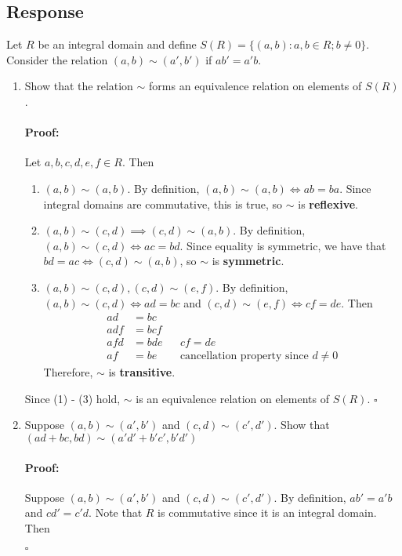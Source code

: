 \documentclass [12pt] {article}
\newenvironment{proof}{\paragraph{Proof:}}{\hfill$\square$}
\begin{document}
\subsection*{Response}
Let $R$ be an integral domain and define $S(R) = \{ (a, b) : a, b \in R; b \neq 0 \}$. Consider
the relation $(a, b) \sim (a', b')$ if $ab' = a'b$.
\begin{enumerate}
    \item Show that the relation $\sim$ forms an equivalence relation on elements of $S(R)$.
        \begin{proof}
            Let $a, b, c, d, e, f \in R$. Then
            \begin{enumerate}[label=\textit{(\roman*)}]
                \item $(a, b) \sim (a, b)$. By definition, $(a, b) \sim (a, b) \iff ab = ba$. Since
                    integral domains are commutative, this is true, so $\sim$ is \textbf{reflexive}.
                \item $(a, b) \sim (c, d) \implies (c, d) \sim (a, b)$. By definition,
                    $(a, b) \sim (c, d) \iff ac = bd$. Since equality is symmetric, we have that
                    $bd = ac \iff (c, d) \sim (a, b)$, so $\sim$ is \textbf{symmetric}.
                \item $(a, b) \sim (c, d), (c, d) \sim (e, f)$. By definition,
                    $(a, b) \sim (c, d) \iff ad = bc$ and $(c, d) \sim (e, f) \iff cf = de$. Then
                    \begin{align*}
                        ad &= bc \\
                        adf &= bcf \\
                        afd &= bde && cf = de \\
                        af &= be && \text{cancellation property since } d \neq 0
                    \end{align*}
                    Therefore, $\sim$ is \textbf{transitive}.
            \end{enumerate}
            Since (1) - (3) hold, $\sim$ is an equivalence relation on elements of $S(R)$.
        \end{proof}
    \item Suppose $(a,b)\sim (a',b')$ and $(c,d)\sim (c',d')$. Show that
        $(ad+bc,bd)\sim (a'd'+b'c',b'd')$
        \begin{proof}
            Suppose $(a, b) \sim (a', b')$ and $(c, d) \sim (c', d')$. By definition, $ab' = a'b$
            and $cd' = c'd$. Note that $R$ is commutative since it is an integral domain. Then

\end{proof}
\end{enumerate}
\end{document}
